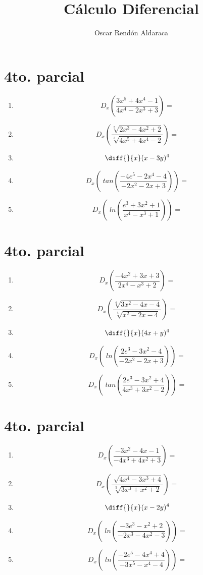 \documentclass[oneside,spanish,letter]{article}
\begin{document}
\title{Cálculo Diferencial}

\author{Oscar Rendón Aldaraca}

\section{4to. parcial}
\begin{enumerate}
 \item $$ D_x \left( \frac{3x^5+4x^4-1}{4x^4-2x^3+3}\right)=$$
 \item $$ D_x \left( \frac{\sqrt[5]{2x^3-4x^2+2}}{\sqrt[3]{4x^5+4x^4-2}}\right)=$$
\item $$\diff{}{x}(x-3y)^4$$
 \item $$ D_x \left(\;tan\left( \frac{-4e^5-2x^4-4}{-2x^2-2x+3}\right)\right)=$$
 \item $$ D_x \left(\;ln\left( \frac{e^3+3x^2+1}{x^4-x^3+1}\right)\right)=$$
 \end{enumerate}
  \newpage
\section{4to. parcial}
\begin{enumerate}
 \item $$ D_x \left( \frac{-4x^2+3x+3}{2x^4-x^3+2}\right)=$$
 \item $$ D_x \left( \frac{\sqrt[4]{3x^2-4x-4}}{\sqrt[4]{x^2-2x-4}}\right)=$$
\item $$\diff{}{x}(4x+y)^4$$
 \item $$ D_x \left(\;ln\left( \frac{2e^3-3x^2-4}{-2x^2-2x+3}\right)\right)=$$
 \item $$ D_x \left(\;tan\left( \frac{2e^3-3x^2+4}{4x^3+3x^2-2}\right)\right)=$$
 \end{enumerate}
  \newpage
\section{4to. parcial}
\begin{enumerate}
 \item $$ D_x \left( \frac{-3x^2-4x-1}{-4x^3+4x^2+3}\right)=$$
 \item $$ D_x \left( \frac{\sqrt[]{4x^4-3x^3+4}}{\sqrt[5]{3x^3+x^2+2}}\right)=$$
\item $$\diff{}{x}(x-2y)^4$$
 \item $$ D_x \left(\;ln\left( \frac{-3e^3-x^2+2}{-2x^3-4x^2-3}\right)\right)=$$
 \item $$ D_x \left(\;ln\left( \frac{-2e^5-4x^4+4}{-3x^5-x^4-4}\right)\right)=$$
 \end{enumerate}
  \newpage
\end{document}
